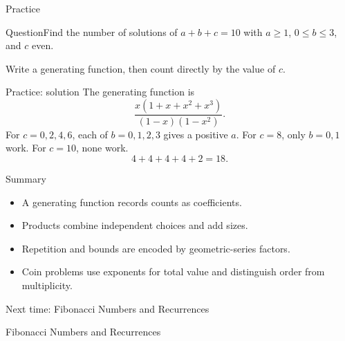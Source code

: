 \documentclass[aspectratio=169,11pt]{beamer}
\newcommand{\Question}[1]{\begin{block}{Question}#1\end{block}}
\newcommand{\gap}{\par\medskip}
\begin{document}
\begin{frame}{Practice}
\large
\Question{Find the number of solutions of $a+b+c=10$ with $a\geq1$, $0\leq b\leq3$, and $c$ even.}
\gap Write a generating function, then count directly by the value of $c$.
\end{frame}
\begin{frame}{Practice: solution}
\large
\normalsize
The generating function is
\[\frac{x(1+x+x^2+x^3)}{(1-x)(1-x^2)}.\]
For $c=0,2,4,6$, each of $b=0,1,2,3$ gives a positive $a$. For $c=8$, only $b=0,1$ work. For $c=10$, none work.
\[4+4+4+4+2=18.\]
\end{frame}
\begin{frame}{Summary}
\large
\begin{itemize}
\item A generating function records counts as coefficients.
\item Products combine independent choices and add sizes.
\item Repetition and bounds are encoded by geometric-series factors.
\item Coin problems use exponents for total value and distinguish order from multiplicity.
\end{itemize}
\end{frame}
\begin{frame}{Next time: Fibonacci Numbers and Recurrences}\begin{center}{\Huge Fibonacci Numbers and Recurrences}\end{center}\end{frame}
\end{document}
